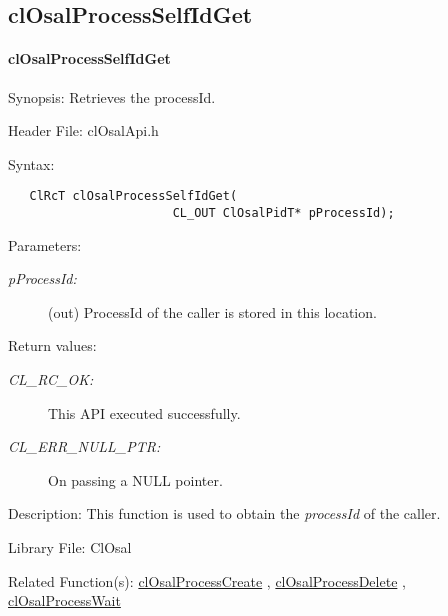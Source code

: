 \subsection{clOsalProcessSelfIdGet}
\hypertarget{pageosal144}{}\paragraph{cl\-Osal\-Process\-Self\-Id\-Get}\label{pageosal144}
\begin{Desc}
\item[Synopsis:]Retrieves the process\-Id.\end{Desc}
\begin{Desc}
\item[Header File:]clOsalApi.h\end{Desc}
\begin{Desc}
\item[Syntax:]

\footnotesize\begin{verbatim}   ClRcT clOsalProcessSelfIdGet(
                       CL_OUT ClOsalPidT* pProcessId);
\end{verbatim}
\normalsize
\end{Desc}
\begin{Desc}
\item[Parameters:]
\begin{description}
\item[{\em p\-Process\-Id:}](out) Process\-Id of the caller is stored in this location.\end{description}
\end{Desc}
\begin{Desc}
\item[Return values:]
\begin{description}
\item[{\em CL\_\-RC\_\-OK:}]This API executed successfully. \item[{\em CL\_\-ERR\_\-NULL\_\-PTR:}]On passing a NULL pointer.\end{description}
\end{Desc}
\begin{Desc}
\item[Description:]This function is used to obtain the {\em process\-Id\/} of the caller.\end{Desc}
\begin{Desc}
\item[Library File:]Cl\-Osal\end{Desc}
\begin{Desc}
\item[Related Function(s):]\hyperlink{pageosal139}{cl\-Osal\-Process\-Create} , \hyperlink{pageosal142}{cl\-Osal\-Process\-Delete} , 
\hyperlink{pageosal143}{cl\-Osal\-Process\-Wait} \end{Desc}


